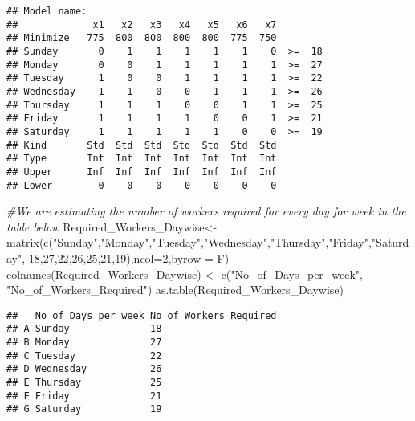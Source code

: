 \documentclass[
]{article}
\newenvironment{Shaded}{\begin{snugshade}}{\end{snugshade}}
\newcommand{\AttributeTok}[1]{\textcolor[rgb]{0.77,0.63,0.00}{#1}}
\newcommand{\CommentTok}[1]{\textcolor[rgb]{0.56,0.35,0.01}{\textit{#1}}}
\newcommand{\DecValTok}[1]{\textcolor[rgb]{0.00,0.00,0.81}{#1}}
\newcommand{\FunctionTok}[1]{\textcolor[rgb]{0.00,0.00,0.00}{#1}}
\newcommand{\NormalTok}[1]{#1}
\newcommand{\OtherTok}[1]{\textcolor[rgb]{0.56,0.35,0.01}{#1}}
\newcommand{\StringTok}[1]{\textcolor[rgb]{0.31,0.60,0.02}{#1}}
\begin{document}
\begin{verbatim}
## Model name: 
##             x1   x2   x3   x4   x5   x6   x7        
## Minimize   775  800  800  800  800  775  750        
## Sunday       0    1    1    1    1    1    0  >=  18
## Monday       0    0    1    1    1    1    1  >=  27
## Tuesday      1    0    0    1    1    1    1  >=  22
## Wednesday    1    1    0    0    1    1    1  >=  26
## Thursday     1    1    1    0    0    1    1  >=  25
## Friday       1    1    1    1    0    0    1  >=  21
## Saturday     1    1    1    1    1    0    0  >=  19
## Kind       Std  Std  Std  Std  Std  Std  Std        
## Type       Int  Int  Int  Int  Int  Int  Int        
## Upper      Inf  Inf  Inf  Inf  Inf  Inf  Inf        
## Lower        0    0    0    0    0    0    0
\end{verbatim}

\begin{Shaded}
\begin{Highlighting}[]
\CommentTok{\#We are estimating the number of workers required for every day for week in the table below}
\NormalTok{Required\_Workers\_Daywise}\OtherTok{\textless{}{-}} \FunctionTok{matrix}\NormalTok{(}\FunctionTok{c}\NormalTok{(}\StringTok{"Sunday"}\NormalTok{,}\StringTok{"Monday"}\NormalTok{,}\StringTok{"Tuesday"}\NormalTok{,}\StringTok{"Wednesday"}\NormalTok{,}\StringTok{"Thursday"}\NormalTok{,}\StringTok{"Friday"}\NormalTok{,}\StringTok{"Saturday"}\NormalTok{,}
\DecValTok{18}\NormalTok{,}\DecValTok{27}\NormalTok{,}\DecValTok{22}\NormalTok{,}\DecValTok{26}\NormalTok{,}\DecValTok{25}\NormalTok{,}\DecValTok{21}\NormalTok{,}\DecValTok{19}\NormalTok{),}\AttributeTok{ncol=}\DecValTok{2}\NormalTok{,}\AttributeTok{byrow =}\NormalTok{ F)}
\FunctionTok{colnames}\NormalTok{(Required\_Workers\_Daywise) }\OtherTok{\textless{}{-}} \FunctionTok{c}\NormalTok{(}\StringTok{"No\_of\_Days\_per\_week"}\NormalTok{, }\StringTok{"No\_of\_Workers\_Required"}\NormalTok{)}
\FunctionTok{as.table}\NormalTok{(Required\_Workers\_Daywise)}
\end{Highlighting}
\end{Shaded}

\begin{verbatim}
##   No_of_Days_per_week No_of_Workers_Required
## A Sunday              18                    
## B Monday              27                    
## C Tuesday             22                    
## D Wednesday           26                    
## E Thursday            25                    
## F Friday              21                    
## G Saturday            19
\end{verbatim}
\end{document}
